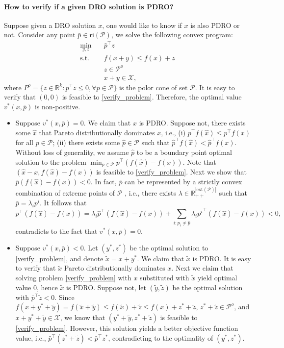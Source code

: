 \documentclass[10pt]{article}
\theoremstyle{plain}
\theoremstyle{definition}
\theoremstyle{remark}
\newcommand{\mcal}{\mathcal}
\newcommand{\tr}{^{\top}}
\newcommand{\subjectto}{\text{s.t.}}
\newcommand{\cP}{\mathcal{P}}
\newcommand{\R}{\mathbb{R}}
\begin{document}
\paragraph{How to verify if a given DRO solution is PDRO?}
Suppose given a DRO solution $x$, one would like to know if $x$ is also PDRO or not.
Consider any point $\bar{p}\in \text{ri}(\cP)$, we solve the following convex program:
\begin{subequations}\label{verify_problem}
\begin{align}
\min_{y,z}\quad & \bar{p}\tr z\\
\subjectto \quad & f(x+y)\le f(x) + z\\
& z\in \cP^o\\
&x+y\in \mcal{X},
\end{align}
\end{subequations}
where $P^o= \{z\in\R^k: p\tr z\le 0, \forall p\in \cP\}$ is the polor cone of set $\cP$.
It is easy to verify that $(0,0)$ is feasible to \eqref{verify_problem}.
Therefore, the optimal value $v^*(x,\bar{p})$ is non-positive.
\begin{itemize}[topsep=0pt,noitemsep]
	\item {\color{red} Suppose $v^*(x,\bar{p}) = 0$. We claim that $x$ is PDRO.}
	Suppose not, there exists some $\hat{x}$ that Pareto distributionally dominates $x$, i.e.,
	(i) $p\tr f(\hat{x}) \le p\tr f(x)$ for all $p\in \cP$;
	(ii) there exists some $\hat{p}\in \cP$ such that $\hat{p}\tr f(\hat{x}) < \hat{p}\tr f(x)$. Without loss of generality, we assume $\hat{p}$ to be a boundary point optimal solution to the problem $\min_{p\in \cP}p\tr (f(\hat{x}) - f(x))$.
	Note that $(\hat{x}-x, f(\hat{x})-f(x))$ is feasible to \eqref{verify_problem}.
	Next we show that $\bar{p}(f(\hat{x})-f(x))<0$.
	In fact, $\bar{p}$ can be represented by a strictly convex combination of extreme
	points of $\cP$ \citep[see][]{rockafellar1970convex}, i.e.,
	there exists $\lambda\in \R^{|\text{ext}(\cP)|}_{++}$ such that
	$\bar{p} = \lambda_ip^i$.
	It follows that
	\[\bar{p}\tr(f(\hat{x})-f(x)) = \lambda_i\hat{p}\tr (f(\hat{x})-f(x)) +
	\sum_{i:p_i\neq \hat{p}}\lambda_i {p^i}\tr (f(\hat{x})-f(x)) < 0,\]
	contradicts to the fact that  $v^*(x,\bar{p}) = 0$.
	
	\item {\color{red} Suppose $v^*(x,\bar{p}) < 0$.}
	Let $(y^*,z^*)$ be the optimal solution to \eqref{verify_problem},
	and denote $\tilde{x} = x+y^*$.
	{\color{red}We claim that $\tilde{x}$ is PDRO.}
	It is easy to verify that $\tilde{x}$ Pareto distributionally dominates $x$.
	Next we claim that solving problem \eqref{verify_problem} with $x$ substituted
	with $\tilde{x}$ yield optimal value 0, hence $\tilde{x}$ is PDRO.
	Suppose not, let $(\tilde{y},\tilde{z})$ be the optimal solution with
	$\bar{p}\tr \tilde{z} <0$.
	Since $f(x+y^*+\tilde{y}) = f(\tilde{x}+\tilde{y}) \le f(\tilde{x}) + \tilde{z} \le f(x)+z^*+\tilde{z}$,
	$z^*+\tilde{z}\in \cP^o$, and $x+y^*+\tilde{y}\in \mcal{X}$,
	we know that $(y^*+\tilde{y},z^*+\tilde{z})$ is feasible to \eqref{verify_problem}. However, this solution yields a better objective function
	value, i.e., $\bar{p}\tr (z^*+\tilde{z}) < \bar{p}\tr z^*$, contradicting to
	the optimality of $(y^*,z^*)$.
\end{itemize}
\end{document}
